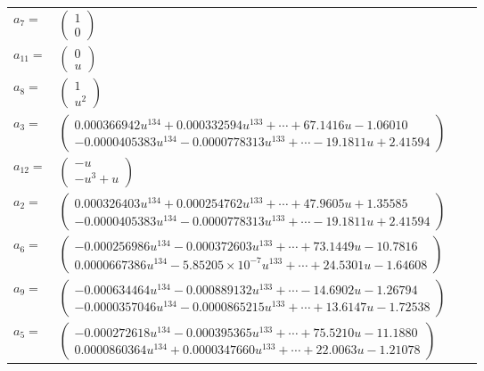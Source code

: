\documentclass[1p]{elsarticle_modified}
\theoremstyle{definition}
\begin{document}
\begin{tabular}{m{7pt} m{180pt} m{7pt} m{180pt} }
\flushright $a_{7}=$&$\begin{pmatrix}1\\0\end{pmatrix}$ \\
\flushright $a_{11}=$&$\begin{pmatrix}0\\u\end{pmatrix}$ \\
\flushright $a_{8}=$&$\begin{pmatrix}1\\u^2\end{pmatrix}$ \\
\flushright $a_{3}=$&$\begin{pmatrix}0.000366942 u^{134}+0.000332594 u^{133}+\cdots+67.1416 u-1.06010\\-0.0000405383 u^{134}-0.0000778313 u^{133}+\cdots-19.1811 u+2.41594\end{pmatrix}$ \\
\flushright $a_{12}=$&$\begin{pmatrix}- u\\- u^3+u\end{pmatrix}$ \\
\flushright $a_{2}=$&$\begin{pmatrix}0.000326403 u^{134}+0.000254762 u^{133}+\cdots+47.9605 u+1.35585\\-0.0000405383 u^{134}-0.0000778313 u^{133}+\cdots-19.1811 u+2.41594\end{pmatrix}$ \\
\flushright $a_{6}=$&$\begin{pmatrix}-0.000256986 u^{134}-0.000372603 u^{133}+\cdots+73.1449 u-10.7816\\0.0000667386 u^{134}-5.85205\times10^{-7} u^{133}+\cdots+24.5301 u-1.64608\end{pmatrix}$ \\
\flushright $a_{9}=$&$\begin{pmatrix}-0.000634464 u^{134}-0.000889132 u^{133}+\cdots-14.6902 u-1.26794\\-0.0000357046 u^{134}-0.0000865215 u^{133}+\cdots+13.6147 u-1.72538\end{pmatrix}$ \\
\flushright $a_{5}=$&$\begin{pmatrix}-0.000272618 u^{134}-0.000395365 u^{133}+\cdots+75.5210 u-11.1880\\0.0000860364 u^{134}+0.0000347660 u^{133}+\cdots+22.0063 u-1.21078\end{pmatrix}$ \\

\end{tabular}
\end{document}
